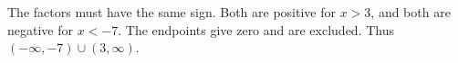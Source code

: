 The factors must have the same sign. Both are positive for $x>3$, and both are negative for $x<-7$. The endpoints give zero and are excluded. Thus $\boxed{(-\infty,-7)\cup(3,\infty)}$.
